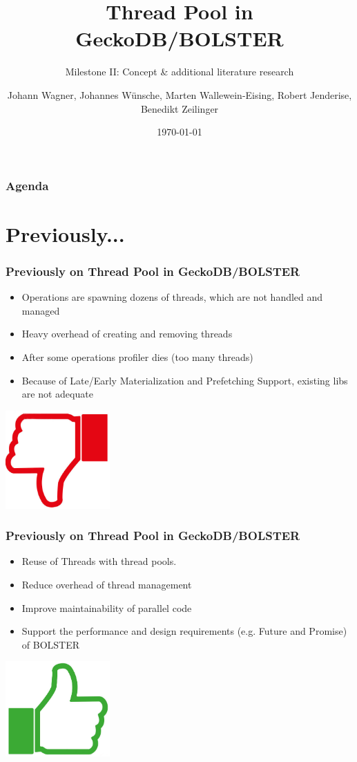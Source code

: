 \documentclass{beamer}
\title{Thread Pool in GeckoDB/BOLSTER}
\subtitle{Milestone II: Concept \& additional literature research}
\author{Johann Wagner, Johannes Wünsche, Marten Wallewein-Eising, Robert Jenderise, Benedikt Zeilinger}
\date{\today}
\institute{Otto von Guericke University, Magdeburg}
\begin{document}
\begin{frame}[plain]
 \titlepage
\end{frame}

\section[Agenda]{}
	\begin{frame}
	\frametitle{Agenda}
	\tableofcontents
	\end{frame}

\section{Previously...}
\begin{frame}
	\frametitle{Previously on Thread Pool in GeckoDB/BOLSTER}
	\begin{itemize}
		\item Operations are spawning dozens of threads, which are not handled and managed
		\item Heavy overhead of creating and removing threads
		\item After some operations profiler dies (too many threads)
		\item Because of Late/Early Materialization and Prefetching Support, existing libs are not adequate
	\end{itemize}
	\begin{center}
		\includegraphics[width=0.3\textwidth]{img/thumbs_down.png}
	\end{center}
\end{frame}

\begin{frame}
	\frametitle{Previously on Thread Pool in GeckoDB/BOLSTER}
	\begin{itemize}
		\item Reuse of Threads with thread pools.
		\item Reduce overhead of thread management
		\item Improve maintainability of parallel code
		\item Support the performance and design requirements (e.g. Future and Promise) of BOLSTER
	\end{itemize}
	\begin{center}
		\includegraphics[width=0.3\textwidth]{img/thumbs_up.png}
	\end{center}
\end{frame}
\end{document}
